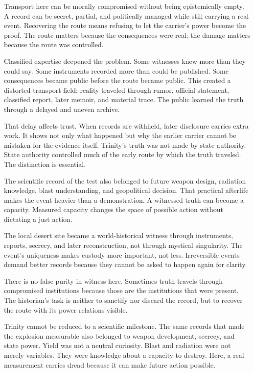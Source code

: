 Transport here can be morally compromised without being epistemically
empty. A record can be secret, partial, and politically managed while
still carrying a real event. Recovering the route means refusing to let
the carrier's power become the proof. The route matters because
the consequences were real; the damage matters because the route was
controlled.

Classified expertise deepened the problem. Some witnesses
knew more than they could say. Some instruments recorded more than could
be published. Some consequences became public before the route became
public. This created a distorted transport field: reality traveled
through rumor, official statement, classified report, later memoir, and
material trace. The public learned the truth through a delayed and
uneven archive.

That delay affects trust. When records are withheld, later disclosure
carries extra work. It shows not only what happened but why the earlier
carrier cannot be mistaken for the evidence itself. Trinity's truth was
not made by state authority. State authority controlled much of the
early route by which the truth traveled. The distinction is essential.

The scientific record of the test also belonged to future weapon design,
radiation knowledge, blast understanding, and geopolitical decision.
That practical afterlife makes the event heavier than a demonstration.
A witnessed truth can become a capacity. Measured capacity changes the
space of possible action without dictating a just action.

The local desert site became a world-historical witness through
instruments, reports, secrecy, and later reconstruction, not through
mystical singularity. The event's uniqueness makes custody more
important, not less. Irreversible events demand better records because
they cannot be asked to happen again for clarity.

There is no false purity in witness here. Sometimes truth travels
through compromised institutions because those are the institutions
that were present. The historian's task is neither to sanctify nor
discard the record, but to recover the route with its power relations
visible.

Trinity cannot be reduced to a scientific milestone. The same records
that made the explosion measurable also belonged to weapon development,
secrecy, and state power. Yield was not a neutral curiosity. Blast and
radiation were not merely variables. They were knowledge about a
capacity to destroy. Here, a real measurement carries dread because it
can make future action possible.


